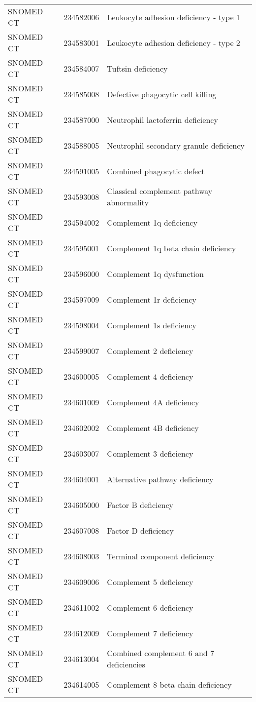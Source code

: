 \begin{longtable}{p{}p{}p{}}
  SNOMED CT & 234582006 & Leukocyte adhesion deficiency - type 1 \\ 
  SNOMED CT & 234583001 & Leukocyte adhesion deficiency - type 2 \\ 
  SNOMED CT & 234584007 & Tuftsin deficiency \\ 
  SNOMED CT & 234585008 & Defective phagocytic cell killing \\ 
  SNOMED CT & 234587000 & Neutrophil lactoferrin deficiency \\ 
  SNOMED CT & 234588005 & Neutrophil secondary granule deficiency \\ 
  SNOMED CT & 234591005 & Combined phagocytic defect \\ 
  SNOMED CT & 234593008 & Classical complement pathway abnormality \\ 
  SNOMED CT & 234594002 & Complement 1q deficiency \\ 
  SNOMED CT & 234595001 & Complement 1q beta chain deficiency \\ 
  SNOMED CT & 234596000 & Complement 1q dysfunction \\ 
  SNOMED CT & 234597009 & Complement 1r deficiency \\ 
  SNOMED CT & 234598004 & Complement 1s deficiency \\ 
  SNOMED CT & 234599007 & Complement 2 deficiency \\ 
  SNOMED CT & 234600005 & Complement 4 deficiency \\ 
  SNOMED CT & 234601009 & Complement 4A deficiency \\ 
  SNOMED CT & 234602002 & Complement 4B deficiency \\ 
  SNOMED CT & 234603007 & Complement 3 deficiency \\ 
  SNOMED CT & 234604001 & Alternative pathway deficiency \\ 
  SNOMED CT & 234605000 & Factor B deficiency \\ 
  SNOMED CT & 234607008 & Factor D deficiency \\ 
  SNOMED CT & 234608003 & Terminal component deficiency \\ 
  SNOMED CT & 234609006 & Complement 5 deficiency \\ 
  SNOMED CT & 234611002 & Complement 6 deficiency \\ 
  SNOMED CT & 234612009 & Complement 7 deficiency \\ 
  SNOMED CT & 234613004 & Combined complement 6 and 7 deficiencies \\ 
  SNOMED CT & 234614005 & Complement 8 beta chain deficiency \\ 

\end{longtable}
